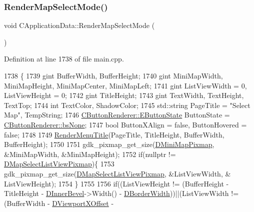 \subsubsection{\texorpdfstring{Render\+Map\+Select\+Mode()}{RenderMapSelectMode()}}
{\footnotesize\ttfamily void C\+Application\+Data\+::\+Render\+Map\+Select\+Mode (\begin{DoxyParamCaption}{ }\end{DoxyParamCaption})\hspace{0.3cm}{\ttfamily [protected]}}



Definition at line 1738 of file main.\+cpp.


\begin{DoxyCode}
1738                                           \{
1739     gint BufferWidth, BufferHeight;
1740     gint MiniMapWidth, MiniMapHeight, MiniMapCenter, MiniMapLeft;
1741     gint ListViewWidth = 0, ListViewHeight = 0;
1742     gint TitleHeight;
1743     gint TextWidth, TextHeight, TextTop;
1744     \textcolor{keywordtype}{int} TextColor, ShadowColor;
1745     std::string PageTitle = \textcolor{stringliteral}{"Select Map"}, TempString;
1746     \hyperlink{classCButtonRenderer_ae0eccda184600f6e14bfd59033e5e9a1}{CButtonRenderer::EButtonState} ButtonState = 
      \hyperlink{classCButtonRenderer_ae0eccda184600f6e14bfd59033e5e9a1aa0cd7277705307bef6c50f2250b5d62d}{CButtonRenderer::bsNone};
1747     \textcolor{keywordtype}{bool} ButtonXAlign = \textcolor{keyword}{false}, ButtonHovered = \textcolor{keyword}{false};
1748     
1749     \hyperlink{classCApplicationData_a548c5924a281c7e226fd7cac44e59920}{RenderMenuTitle}(PageTitle, TitleHeight, BufferWidth, BufferHeight); 
1750 
1751     gdk\_pixmap\_get\_size(\hyperlink{classCApplicationData_abe3af81659ead5113b7b2f165a88e737}{DMiniMapPixmap}, &MiniMapWidth, &MiniMapHeight); 
1752     \textcolor{keywordflow}{if}(\textcolor{keyword}{nullptr} != \hyperlink{classCApplicationData_a76e4af228d69ca3c6b1cf0770ca2e7a0}{DMapSelectListViewPixmap})\{
1753         gdk\_pixmap\_get\_size(\hyperlink{classCApplicationData_a76e4af228d69ca3c6b1cf0770ca2e7a0}{DMapSelectListViewPixmap}, &ListViewWidth, &
      ListViewHeight); 
1754     \}
1755 
1756     \textcolor{keywordflow}{if}((ListViewHeight != (BufferHeight - TitleHeight - \hyperlink{classCApplicationData_a29a687c44dceb9e87a56d96612d59ab5}{DInnerBevel}->Width() - 
      \hyperlink{classCApplicationData_a566b69c72fa982c6ecf8e47dc21df489}{DBorderWidth}))||(ListViewWidth != (BufferWidth - \hyperlink{classCApplicationData_a306bba873ccc47126111305fe21ef3ff}{DViewportXOffset} - 

\end{DoxyCode}
